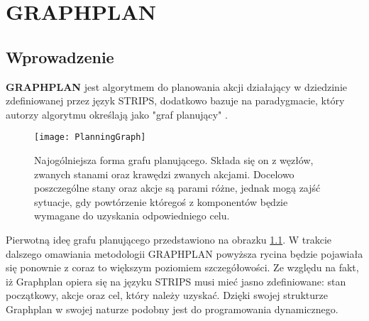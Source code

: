 \chapter{GRAPHPLAN}
\thispagestyle{chapterBeginStyle}
\label{GRAPHPLANRozdzial}

\section{Wprowadzenie}
    \textbf{GRAPHPLAN} jest algorytmem do planowania akcji działający w dziedzinie zdefiniowanej
    przez język STRIPS, dodatkowo bazuje na paradygmacie, który autorzy algorytmu określają jako "graf planujący" \cite{GRAPHPLAN}.
    \begin{figure}[H]
        \texttt{[image: PlanningGraph]}
        \centering
        \caption{Najogólniejsza forma grafu planującego. Składa się on z węzłów, zwanych stanami oraz krawędzi zwanych akcjami. Docelowo poszczególne 
        stany oraz akcje są parami różne, jednak mogą zajść sytuacje, gdy powtórzenie któregoś z komponentów będzie wymagane do uzyskania odpowiedniego
        celu.}
        \label{PlanningGraph}
    \end{figure}
    Pierwotną ideę grafu planującego przedstawiono na obrazku \ref{PlanningGraph}. W trakcie dalszego omawiania metodologii GRAPHPLAN powyższa 
    rycina będzie pojawiała się ponownie z coraz to większym poziomiem szczegółowości.
    Ze względu na fakt, iż Graphplan opiera się na języku STRIPS musi mieć jasno zdefiniowane: stan początkowy, akcje oraz cel, który należy uzyskać.
    Dzięki swojej strukturze Graphplan w swojej naturze podobny jest do programowania dynamicznego.

